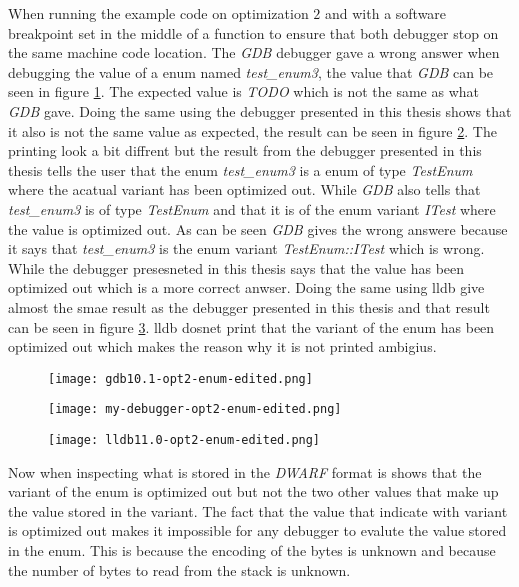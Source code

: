 When running the example code on optimization $2$ and with a software breakpoint set in the middle of a function to ensure that both debugger stop on the same machine code location.
The \emph{GDB} debugger gave a wrong answer when debugging the value of a enum named \emph{test\_enum3}, the value that \emph{GDB} can be seen in figure \ref{fig:gdbenum}.
The expected value is \emph{TODO} which is not the same as what \emph{GDB} gave.
Doing the same using the debugger presented in this thesis shows that it also is not the same value as expected, the result can be seen in  figure \ref{fig:mydebuggerenum}.
The printing look a bit diffrent but the result from the debugger presented in this thesis tells the user that the enum \emph{test\_enum3} is a enum of type \emph{TestEnum} where the acatual variant has been optimized out.
While \emph{GDB} also tells that \emph{test\_enum3} is of type \emph{TestEnum} and that it is of the enum variant \emph{ITest} where the value is optimized out.
As can be seen \emph{GDB} gives the wrong answere because it says that \emph{test\_enum3} is the enum variant \emph{TestEnum::ITest} which is wrong.
While the debugger presesneted in this thesis says that the value has been optimized out which is a more correct anwser.
Doing the same using \gls{lldb} give almost the smae result as the debugger presented in this thesis and that result can be seen in figure \ref{fig:lldbenum}.
\gls{lldb} dosnet print that the variant of the enum has been optimized out which makes the reason why it is not printed ambigius.


\begin{figure}[h]
    \centering
    \texttt{[image: gdb10.1-opt2-enum-edited.png]}
    \label{fig:gdbenum}
\end{figure}


\begin{figure}[h]
    \centering
    \texttt{[image: my-debugger-opt2-enum-edited.png]}
    \label{fig:mydebuggerenum}
\end{figure}


\begin{figure}[h]
    \centering
    \texttt{[image: lldb11.0-opt2-enum-edited.png]}
    \label{fig:lldbenum}
\end{figure}


Now when inspecting what is stored in the \emph{DWARF} format is shows that the variant of the enum is optimized out but not the two other values that make up the value stored in the variant.
The fact that the value that indicate with variant is optimized out makes it impossible for any debugger to evalute the value stored in the enum.
This is because the encoding of the bytes is unknown and because the number of bytes to read from the stack is unknown.


